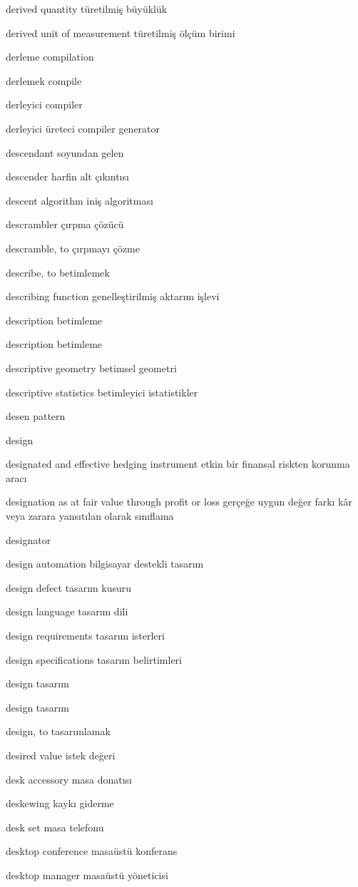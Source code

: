 \documentclass[12pt,fleqn]{article}\usepackage{../../common}
\begin{document}
derived quantity türetilmiş büyüklük

derived unit of measurement türetilmiş ölçüm birimi

derleme compilation

derlemek compile

derleyici compiler

derleyici üreteci compiler generator

descendant soyundan gelen

descender harfin alt çıkıntısı

descent algorithm iniş algoritması

descrambler çırpma çözücü

descramble, to çırpmayı çözme

describe, to betimlemek

describing function genelleştirilmiş aktarım işlevi

description betimleme

description betimleme

descriptive geometry betimsel geometri

descriptive statistics betimleyici istatistikler

desen pattern

design

designated and effective hedging instrument etkin bir finansal riskten korunma aracı

designation as at fair value through profit or loss gerçeğe uygun değer farkı kâr veya zarara yansıtılan olarak sınıflama

designator

design automation bilgisayar destekli tasarım

design defect tasarım kusuru

design language tasarım dili

design requirements tasarım isterleri

design specifications tasarım belirtimleri

design tasarım

design tasarım

design, to tasarımlamak

desired value istek değeri

desk accessory masa donatısı

deskewing kaykı giderme

desk set masa telefonu

desktop conference masaüstü konferans

desktop manager masaüstü yöneticisi
\end{document}

